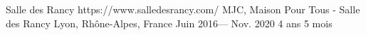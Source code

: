 \volunteerorganization%
{Salle des Rancy}%
{https://www.salledesrancy.com/}
{MJC, Maison Pour Tous - Salle des Rancy}
{Lyon, Rhône-Alpes, France}%
{Juin 2016--- Nov. 2020}
{4 ans 5 mois}
